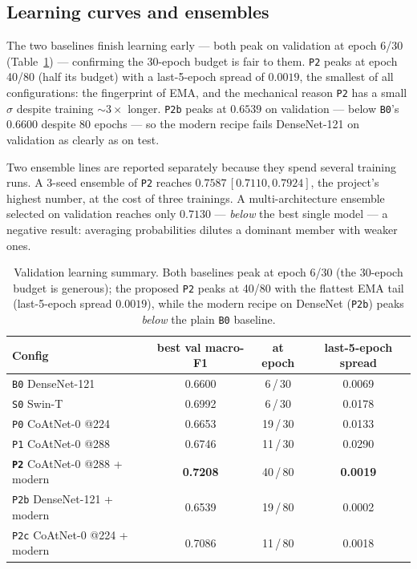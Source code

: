 \documentclass[11pt,a4paper]{article}
\newcommand{\macroF}{\textup{macro-F1}}   %
\begin{document}
\subsection{Learning curves and ensembles}
The two baselines finish learning early --- both peak on validation at
epoch 6/30 (Table~\ref{tab:curves}) --- confirming the 30-epoch budget is fair to
them. \texttt{P2} peaks at epoch 40/80 (half its budget) with a last-5-epoch
spread of $0.0019$, the smallest of all configurations: the fingerprint of EMA,
and the mechanical reason \texttt{P2} has a small $\sigma$ despite training
$\sim3\times$ longer. \texttt{P2b} peaks at $0.6539$ on validation --- below
\texttt{B0}'s $0.6600$ despite 80 epochs --- so the modern recipe fails
DenseNet-121 on validation as clearly as on test.

Two ensemble lines are reported separately because they spend several training
runs. A 3-seed ensemble of \texttt{P2} reaches $0.7587\,[0.7110,0.7924]$, the
project's highest number, at the cost of three trainings. A
multi-architecture ensemble selected on validation reaches only $0.7130$ ---
\emph{below} the best single model --- a negative result: averaging probabilities
dilutes a dominant member with weaker ones.

\begin{table}[t]
\centering
\caption{Validation learning summary. Both baselines peak at epoch 6/30 (the
30-epoch budget is generous); the proposed \texttt{P2} peaks at 40/80 with the
flattest EMA tail (last-5-epoch spread $0.0019$), while the modern recipe on
DenseNet (\texttt{P2b}) peaks \emph{below} the plain \texttt{B0} baseline.}
\label{tab:curves}
\begin{tabular}{l c c c}
\toprule
Config & best val \macroF{} & at epoch & last-5-epoch spread \\
\midrule
\texttt{B0} DenseNet-121        & 0.6600 & 6\,/\,30  & 0.0069 \\
\texttt{S0} Swin-T              & 0.6992 & 6\,/\,30  & 0.0178 \\
\texttt{P0} CoAtNet-0 @224      & 0.6653 & 19\,/\,30 & 0.0133 \\
\texttt{P1} CoAtNet-0 @288      & 0.6746 & 11\,/\,30 & 0.0290 \\
\textbf{\texttt{P2}} CoAtNet-0 @288 + modern & \textbf{0.7208} & 40\,/\,80 & \textbf{0.0019} \\
\texttt{P2b} DenseNet-121 + modern & 0.6539 & 19\,/\,80 & 0.0002 \\
\texttt{P2c} CoAtNet-0 @224 + modern & 0.7086 & 11\,/\,80 & 0.0018 \\
\bottomrule
\end{tabular}
\end{table}
\end{document}
